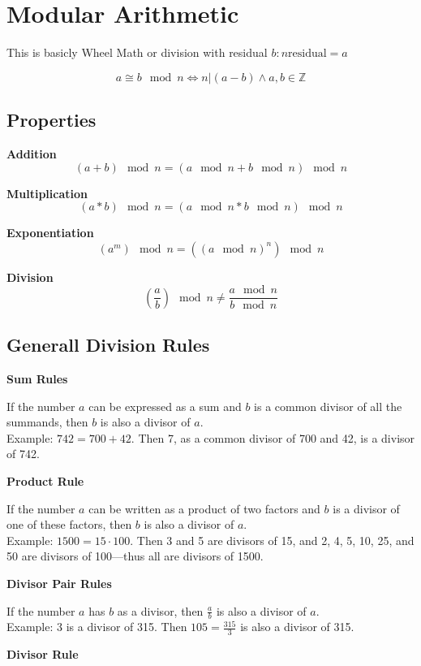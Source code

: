 \section{Modular Arithmetic}

This is basicly Wheel Math or division with residual \(b : n \text{residual} = a\)

\[a \cong b \mod n \iff n | (a - b) \land  a,b \in \mathbb{Z}\]

\subsection{Properties}

\textbf{Addition}
\[(a + b) \mod n = (a \mod n + b \mod n) \mod n\]

\textbf{Multiplication}
\[(a * b) \mod n = (a \mod n * b \mod n) \mod n\]

\textbf{Exponentiation}
\[(a^m) \mod n = ((a \mod n)^n) \mod n\]

\textbf{Division}
\[(\frac{a}{b}) \mod n \ne  \frac{a \mod n}{b \mod n}\]

\subsection{Generall Division Rules}

\textbf{Sum Rules}

If the number \( a \) can be expressed as a sum and \( b \) is a common divisor of all the summands, then \( b \) is also a divisor of \( a \). \\
 Example: \( 742 = 700 + 42 \). Then 7, as a common divisor of 700 and 42, is a divisor of 742.

\textbf{Product Rule}

If the number \( a \) can be written as a product of two factors and \( b \) is a divisor of one of these factors, then \( b \) is also a divisor of \( a \). \\
Example: \( 1500 = 15 \cdot 100 \). Then 3 and 5 are divisors of 15, and 2, 4, 5, 10, 25, and 50 are divisors of 100—thus all are divisors of 1500.

\textbf{Divisor Pair Rules}

If the number \( a \) has \( b \) as a divisor, then \( \frac{a}{b} \) is also a divisor of \( a \). \\
Example: 3 is a divisor of 315. Then \( 105 = \frac{315}{3} \) is also a divisor of 315.

\textbf{Divisor Rule}


